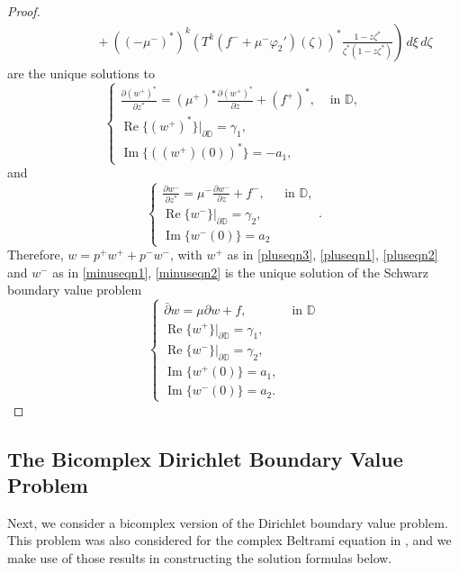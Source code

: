 \documentclass[12pt,reqno]{amsart}
\theoremstyle{definition}
\theoremstyle{remark}
\newcommand{\p}{\partial}
\newcommand{\dbar}{\bar\partial}
\DeclareMathOperator{\im}{Im}
\DeclareMathOperator{\re}{Re}
\newcommand{\disk}{\mathbb{D}}
\begin{document}
\begin{proof}
\begin{align}
            &\quad\quad\quad\quad +  \left. ((-\mu^-)^*)^k (T^k(f^-+\mu^-\varphi_2')(\zeta))^*\frac{1-z \zeta^*}{\zeta^*(1-z\zeta^*)} \right)\,d\xi\,d\zeta\label{minuseqn2}
        \end{align}
        are the unique solutions to 
         \[
            \begin{cases}
                \frac{\p (w^+)^*}{\p z^*} = (\mu^+)^* \frac{\p (w^+)^*}{\p z} + (f^+)^*, & \text{ in }\disk,\\
                \re\{(w^+)^*\}|_{\p\disk} = \gamma_1,\\
                \im\{((w^+)(0))^*\} = -a_1,
            \end{cases}
        \] 
        and
        \[
            \begin{cases}
                \frac{\p w^-}{\p z^*} = \mu^- \frac{\p w^-}{\p z} + f^-, & \text{ in } \disk,\\
                \re\{w^-\}|_{\p \disk} = \gamma_2,\\
                \im\{w^-(0)\} = a_2
            \end{cases}.
        \]
        Therefore, $w = p^+ w^+ + p^-w^-$, with $w^+$ as in \eqref{pluseqn3}, \eqref{pluseqn1}, \eqref{pluseqn2} and $w^-$ as in \eqref{minuseqn1}, \eqref{minuseqn2} is the unique solution of the Schwarz boundary value problem
         \[
            \begin{cases}
                \dbar w = \mu \p w + f, & \text{ in } \disk\\
                \re\{w^+\}|_{\p\disk} = \gamma_1, \\
                \re\{w^-\}|_{\p\disk} = \gamma_2,\\
                \im\{w^+(0)\} = a_1, \\
                \im\{w^-(0)\} = a_2.
            \end{cases}
        \]  
\end{proof}

\subsection{The Bicomplex Dirichlet Boundary Value Problem}

Next, we consider a bicomplex version of the Dirichlet boundary value problem. This problem was also considered for the complex Beltrami equation in \cite{BeltramiSchwarz}, and we make use of those results in constructing the solution formulas below. 
\end{document}
